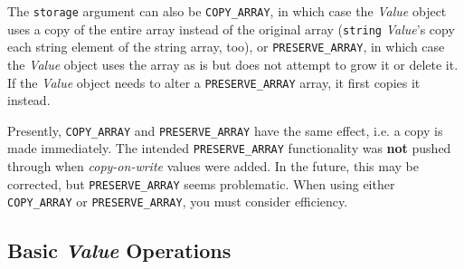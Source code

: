 The {\tt storage} argument can also be {\tt COPY\_ARRAY}, in which case
the {\em Value} object uses a copy of the entire array instead of the
original array ({\tt string} {\em Value\/}'s copy each string element
of the string array, too), or {\tt PRESERVE\_ARRAY}, in which case the
{\em Value} object uses the array as is but does not attempt to grow it
or delete it.  If the {\em Value} object needs to alter a {\tt PRESERVE\_ARRAY}
array, it first copies it instead.

Presently, {\tt COPY\_ARRAY} and {\tt PRESERVE\_ARRAY} have the same effect,
i.e. a copy is made immediately. The intended {\tt PRESERVE\_ARRAY} functionality
was \textbf{ not} pushed through when {\em copy-on-write} values were added. In
the future, this may be corrected, but {\tt PRESERVE\_ARRAY} seems problematic.
When using either {\tt COPY\_ARRAY} or {\tt PRESERVE\_ARRAY}, you must consider
efficiency.

\subsection{Basic {\em Value} Operations}
\label{basic-value-funcs}


